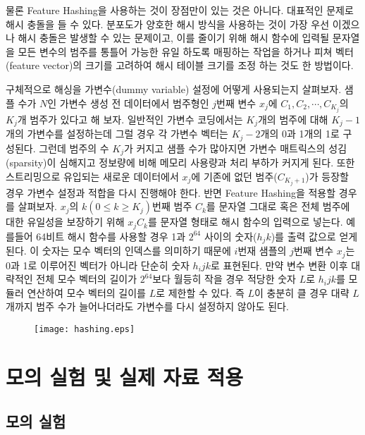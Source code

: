 \documentclass[oneside,b5paper,11pt]{book} %
\begin{document}
 물론 Feature Hashing을 사용하는 것이 장점만이 있는 것은 아니다. 대표적인 문제로 해시 충돌을 들 수 있다. 분포도가 양호한 해시 방식을 사용하는 것이 가장 우선 이겠으나 해시 충돌은 발생할 수 있는 문제이고, 이를 줄이기 위해 해시 함수에 입력될 문자열을 모든 변수의 범주를 통틀어 가능한 유일 하도록 매핑하는 작업을 하거나 피쳐 벡터(feature vector)의 크기를 고려하여 해시 테이블 크기를 조정 하는 것도 한 방법이다.

 구체적으로 해싱을 가변수(dummy variable) 설정에 어떻게 사용되는지 살펴보자. 샘플 수가 $N$인 가변수 생성 전 데이터에서 범주형인 $j$번째 변수 $x_j$에 $C_1 , C_2 , \cdots , C_{K_j}$의 $K_j$개 범주가 있다고 해 보자. 일반적인 가변수 코딩에서는 $K_j$개의 범주에 대해 $K_j - 1$개의 가변수를 설정하는데 그럴 경우 각 가변수 벡터는 $K_j - 2$개의 0과 1개의 1로 구성된다. 그런데 범주의 수 $K_j$가 커지고 샘플 수가 많아지면 가변수 매트릭스의 성김(sparsity)이 심해지고 정보량에 비해 메모리 사용량과 처리 부하가 커지게 된다. 또한 스트리밍으로 유입되는 새로운 데이터에서 $x_j$에 기존에 없던 범주($C_{K_j + 1}$)가 등장할 경우 가변수 설정과 적합을 다시 진행해야 한다. 
 반면 Feature Hashing을 적용할 경우를 살펴보자. $x_j$의 $k(0 \leq k \geq K_j)$번째 범주 $C_k$를 문자열 그대로 혹은 전체 범주에 대한 유일성을 보장하기 위해 $x_j C_k$를 문자열 형태로 해시 함수의 입력으로 넣는다. 예를들어 64비트 해시 함수를 사용할 경우 1과 $2^{64}$ 사이의 숫자($h_jk$)를 출력 값으로 얻게 된다. 이 숫자는 모수 벡터의 인덱스를 의미하기 때문에 $i$번재 샘플의 $j$번째 변수 $x_j$는 0과 1로 이루어진 벡터가 아니라 단순히 숫자 $h_ijk$로 표현된다. 만약 변수 변환 이후 대략적인 전체 모수 벡터의 길이가 $2^64$보다 월등히 작을 경우 적당한 숫자 $L$로 $h_ijk$를 모듈러 연산하여 모수 벡터의 길이를 $L$로 제한할 수 있다. 즉 $L$이 충분히 클 경우 대략 $L$개까지 범주 수가 늘어나더라도 가변수를 다시 설정하지 않아도 된다.
 
\begin{figure}
	\centering
	\texttt{[image: hashing.eps]} %
	\caption{}
	\label{fig:}
\end{figure}



%
%
\chapter{모의 실험 및 실제 자료 적용}

\section{모의 실험}
\end{document}

